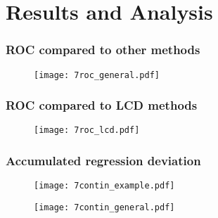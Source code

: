 \newpage
\section{Results and Analysis}
\label{chapter:analysis}






\subsubsection{ROC compared to other methods}

\begin{figure}[h]
    \centering
    \texttt{[image: 7roc\_general.pdf]}
    \caption{}
    \label{fig:7:rocgen}
\end{figure}



\subsubsection{ROC compared to LCD methods}

\begin{figure}[h]
    \centering
    \texttt{[image: 7roc\_lcd.pdf]}
    \caption{}
    \label{fig:7:roclcd}
\end{figure}



\subsubsection{Accumulated regression deviation}

\begin{figure}[h]
    \centering
    \texttt{[image: 7contin\_example.pdf]}
    \caption{}
    \label{fig:7:contex}
\end{figure}

\begin{figure}[h]
    \centering
    \texttt{[image: 7contin\_general.pdf]}
    \caption{}
    \label{fig:7:congen}
\end{figure}

